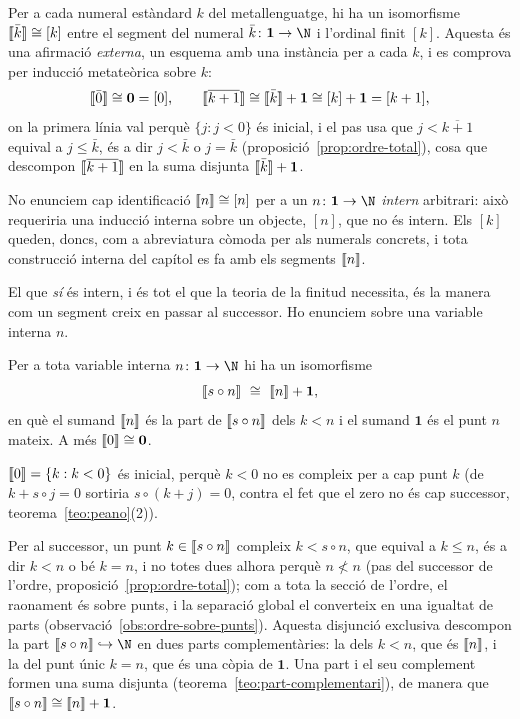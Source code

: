 \begin{observacio}\label{obs:segment-numeral}
Per a cada numeral estàndard \(k\) del metallenguatge, hi ha un isomorfisme
\(\llbracket \bar k\rrbracket\cong[k]\) entre el segment del numeral \(\bar
k\colon\mathbf1\to\N\) i l'ordinal finit \([k]\). Aquesta és una afirmació
\emph{externa}, un esquema amb una instància per a cada \(k\), i es
comprova per inducció metateòrica sobre \(k\):
\[
\llbracket \bar 0\rrbracket\cong\mathbf0=[0],
\qquad
\llbracket \overline{k+1}\rrbracket\cong\llbracket \bar k\rrbracket+\mathbf1\cong[k]+\mathbf1=[k+1],
\]
on la primera línia val perquè \(\{j:j<0\}\) és inicial, i el pas usa que
\(j<\overline{k+1}\) equival a \(j\le\bar k\), és a dir \(j<\bar k\) o
\(j=\bar k\) (proposició~\ref{prop:ordre-total}), cosa que descompon
\(\llbracket \overline{k+1}\rrbracket\) en la suma disjunta \(\llbracket \bar k\rrbracket+\mathbf1\).

No enunciem cap identificació \(\llbracket n\rrbracket\cong[n]\) per a un \(n\colon
\mathbf1\to\N\) \emph{intern} arbitrari: això requeriria una inducció
interna sobre un objecte, \([n]\), que no és intern. Els \([k]\) queden,
doncs, com a abreviatura còmoda per als numerals concrets, i tota
construcció interna del capítol es fa amb els segments \(\llbracket n\rrbracket\).
\end{observacio}

El que \emph{sí} és intern, i és tot el que la teoria de la finitud
necessita, és la manera com un segment creix en passar al successor. Ho
enunciem sobre una variable interna \(n\).

\begin{proposicio}\label{prop:segment-successor}
Per a tota variable interna \(n\colon\mathbf1\to\N\) hi ha un isomorfisme
\[
\seg{s\circ n}\ \cong\ \seg{n}+\mathbf1,
\]
en què el sumand \(\llbracket n\rrbracket\) és la part de \(\llbracket s\circ n\rrbracket\) dels
\(k<n\) i el sumand \(\mathbf1\) és el punt \(n\) mateix. A més
\(\llbracket 0\rrbracket\cong\mathbf0\).
\end{proposicio}

\begin{prova}
\(\llbracket 0\rrbracket=\{k:k<0\}\) és inicial, perquè \(k<0\) no es compleix per a cap
punt \(k\) (de \(k+s\circ j=0\) sortiria \(s\circ(k+j)=0\), contra el
fet que el zero no és cap successor, teorema~\ref{teo:peano}(2)).

Per al successor, un punt \(k\in\llbracket s\circ n\rrbracket\) compleix \(k<s\circ n\),
que equival a \(k\le n\), és a dir \(k<n\) o bé \(k=n\), i no totes dues
alhora perquè \(n\not<n\) (pas del successor de l'ordre,
proposició~\ref{prop:ordre-total}); com a tota la secció de l'ordre, el
raonament és sobre punts, i la separació global el converteix en una
igualtat de parts (observació~\ref{obs:ordre-sobre-punts}). Aquesta disjunció exclusiva
descompon la part \(\seg{s\circ n}\hookrightarrow\N\) en dues parts
complementàries: la dels \(k<n\), que és \(\llbracket n\rrbracket\), i la del punt únic
\(k=n\), que és una còpia de \(\mathbf1\). Una part i el seu complement
formen una suma disjunta (teorema~\ref{teo:part-complementari}), de manera
que \(\llbracket s\circ n\rrbracket\cong\llbracket n\rrbracket+\mathbf1\).
\end{prova}

